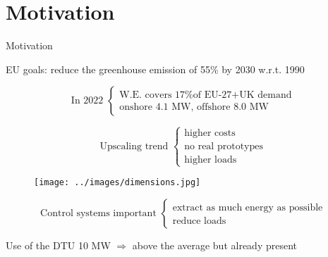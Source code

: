 \section{Motivation}
\begin{frame}{Motivation}
  \begin{myitemize}
    \item EU goals: reduce the greenhouse emission of 55\% by 2030 w.r.t. 1990
    \item 
    \[
      \text{In 2022 }
      \begin{cases}
        \text{W.E. covers 17\% of EU-27+UK demand}\\
        \text{onshore 4.1 MW, offshore 8.0 MW}
      \end{cases}
    \]
    
    \item 
    \begin{multicols}{2}
    \[
      \text{Upscaling trend } 
      \begin{cases}
        \text{higher costs}\\
        \text{no real prototypes} \\
        \text{higher loads}
      \end{cases}  
    \]

      \begin{figure}
        \centering
        \texttt{[image: ../images/dimensions.jpg]}
      \end{figure}
  
    \end{multicols}
    
    \item
    \[
      \text{Control systems important }
      \begin{cases}
        \text{extract as much energy as possible}\\
        \text{reduce loads}
      \end{cases}
    \]

    \item Use of the DTU 10 MW $\Rightarrow$ above the average but already present
  \end{myitemize}
\end{frame}


